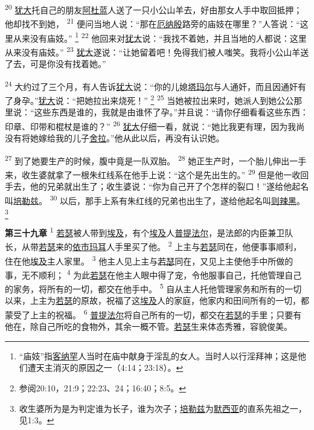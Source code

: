 \textsuperscript{20}
\uline{犹大}托自己的朋友\uline{阿杜蓝}人送了一只小公山羊去，好由那女人手中取回抵押；他却找不到她，
\textsuperscript{21}
便问当地人说：“那在\uline{厄纳殷}路旁的庙妓在哪里？”人答说：“这里从来没有庙妓。”
\footnote{“庙妓”指\uline{客纳罕}人当时在庙中献身于淫乱的女人。当时人以行淫拜神；这是他们遭天主消灭的原因之一（4:14；23:18）。}
\textsuperscript{22}
他回来对\uline{犹大}说：“我找不着她，并且当地的人都说：这里从来没有庙妓。”
\textsuperscript{23}
\uline{犹大}遂说：“让她留着吧！免得我们被人嗤笑。我将小公山羊送了去，可是你没有找着她。”

\textsuperscript{24}
大约过了三个月，有人告诉\uline{犹大}说：“你的儿媳\uline{塔玛尔}与人通奸，而且因通奸有了身孕。”\uline{犹大}说：“把她拉出来烧死！”
\footnote{参阅20:10，21:9；22:23、24；16:40；8:5。}
\textsuperscript{25}
当她被拉出来时，她派人到她公公那里说：“这些东西是谁的，我就是由谁怀了孕。”并且说：“请你仔细看看这些东西：印章、印带和棍杖是谁的？”
\textsuperscript{26}
\uline{犹大}仔细一看，就说：“她比我更有理，因为我尚没有将她嫁给我的儿子\uline{舍拉}。”他从此以后，再没有认识她。

\textsuperscript{27}
到了她要生产的时候，腹中竟是一队双胎。
\textsuperscript{28}
她正生产时，一个胎儿伸出一手来，收生婆就拿了一根朱红线系在他手上说：“这个是先出生的。”
\textsuperscript{29}
但是他一收回手去，他的兄弟就出生了；收生婆说：“你为自己开了个怎样的裂口！”遂给他起名叫\uline{培勒兹}。
\textsuperscript{30}
以后，那手上系有朱红线的兄弟也出生了，遂给他起名叫\uline{则辣黑}。
\footnote{收生婆所为是为判定谁为长子，谁为次子；\uline{培勒兹}为\uline{默西亚}的直系先祖之一，见1:3。}

\textbf{第三十九章\quad}
\textsuperscript{1}
\uline{若瑟}被人带到\uline{埃及}，有个\uline{埃及}人\uline{普提法尔}，是法郎的内臣兼卫队长，从带\uline{若瑟}来的\uline{依市玛耳}人手里买了他。
\textsuperscript{2}
上主与\uline{若瑟}同在，他便事事顺利，住在他\uline{埃及}主人家里。
\textsuperscript{3}
他主人见上主与\uline{若瑟}同在，又见上主使他手中所做的事，无不顺利；
\textsuperscript{4}
为此\uline{若瑟}在他主人眼中得了宠，令他服事自己，托他管理自己的家务，将所有的一切，都交在他手中。
\textsuperscript{5}
自从主人托他管理家务和所有的一切以来，上主为\uline{若瑟}的原故，祝福了这\uline{埃及}人的家庭，他家内和田间所有的一切，都蒙受了上主的祝福。
\textsuperscript{6}
\uline{普提法尔}将自己所有的一切，都交在\uline{若瑟}的手里；只要有他在，除自己所吃的食物外，其余一概不管。\uline{若瑟}生来体态秀雅，容貌俊美。

